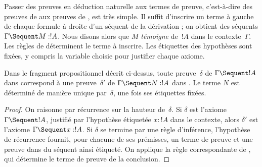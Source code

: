 \documentclass[../../../include/open-logic-section]{subfiles}
\begin{document}


Passer des preuves en déduction naturelle aux termes de preuve,
c'est-à-dire des preuves de  aux preuves de ,
est très simple. Il suffit d'inscrire un terme à gauche
de chaque formule à droite d'un séquent de la dérivation ;
on obtient des séquents $\Gamma \Sequent M : !A$.
Nous disons alors que $M$ \emph{témoigne} de~$!A$
dans le contexte~$\Gamma$.
Les règles de  déterminent le terme à inscrire.
Les étiquettes des hypothèses sont fixées, y compris
la variable choisie pour justifier chaque axiome.

\begin{prop}
Dans le fragment propositionnel décrit ci-dessus, toute preuve~$\delta$
de $\Gamma \Sequent !A$ dans  correspond à une preuve~$\delta'$
de $\Gamma \Sequent N : !A$ dans . Le terme $N$ est déterminé
de manière unique par~$\delta$, une fois ses étiquettes fixées.
\end{prop}

\begin{proof}
On raisonne par récurrence sur la hauteur de~$\delta$.
Si $\delta$ est l'axiome $\Gamma \Sequent !A$, justifié
par l'hypothèse étiquetée $x:!A$ dans le contexte,
alors $\delta'$ est l'axiome $\Gamma \Sequent x:!A$.
Si $\delta$ se termine par une règle d'inférence,
l'hypothèse de récurrence fournit, pour chacune de ses
prémisses, un terme de preuve et une preuve dans 
du séquent ainsi étiqueté.
On applique la règle correspondante de ,
qui détermine le terme de preuve de la conclusion.
\end{proof}
\end{document}
